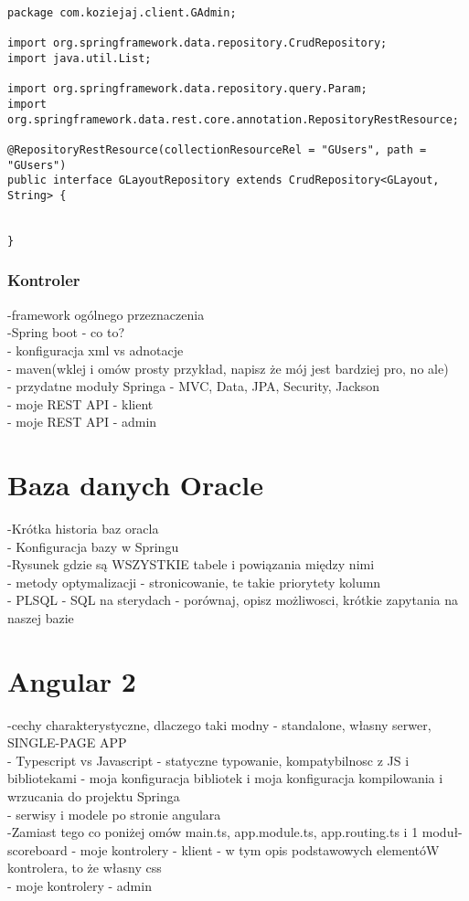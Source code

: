 \documentclass[a4paper,12pt,twoside,openany]{report}
\begin{document}
\begin{lstlisting}
package com.koziejaj.client.GAdmin;

import org.springframework.data.repository.CrudRepository;
import java.util.List;

import org.springframework.data.repository.query.Param;
import org.springframework.data.rest.core.annotation.RepositoryRestResource;

@RepositoryRestResource(collectionResourceRel = "GUsers", path = "GUsers")
public interface GLayoutRepository extends CrudRepository<GLayout, String> {


}

\end{lstlisting}
\subsection{Kontroler}
-framework ogólnego przeznaczenia\\
-Spring boot - co to?\\
- konfiguracja xml vs adnotacje\\
- maven(wklej i omów prosty przykład, napisz że mój jest bardziej pro, no ale)\\
- przydatne moduły Springa - MVC, Data, JPA, Security, Jackson\\
- moje REST API - klient\\
- moje REST API - admin\\

\chapter{Baza danych Oracle}
-Krótka historia baz oracla \\
- Konfiguracja bazy w Springu\\
-Rysunek gdzie są WSZYSTKIE tabele i powiązania między nimi\\
- metody optymalizacji - stronicowanie, te takie priorytety kolumn\\
- PLSQL - SQL na sterydach - porównaj, opisz możliwosci, krótkie zapytania na naszej bazie\\

\chapter{Angular 2}
-cechy charakterystyczne, dlaczego taki modny - standalone, własny serwer, SINGLE-PAGE APP\\
- Typescript vs Javascript - statyczne typowanie, kompatybilnosc z JS i bibliotekami - moja konfiguracja bibliotek i moja konfiguracja kompilowania i wrzucania do projektu Springa\\
- serwisy i modele po stronie angulara\\
-Zamiast tego co poniżej omów main.ts, app.module.ts, app.routing.ts i 1 moduł-scoreboard
- moje kontrolery - klient - w tym opis podstawowych elementóW kontrolera, to że własny css\\
- moje kontrolery - admin\\
\end{document}
